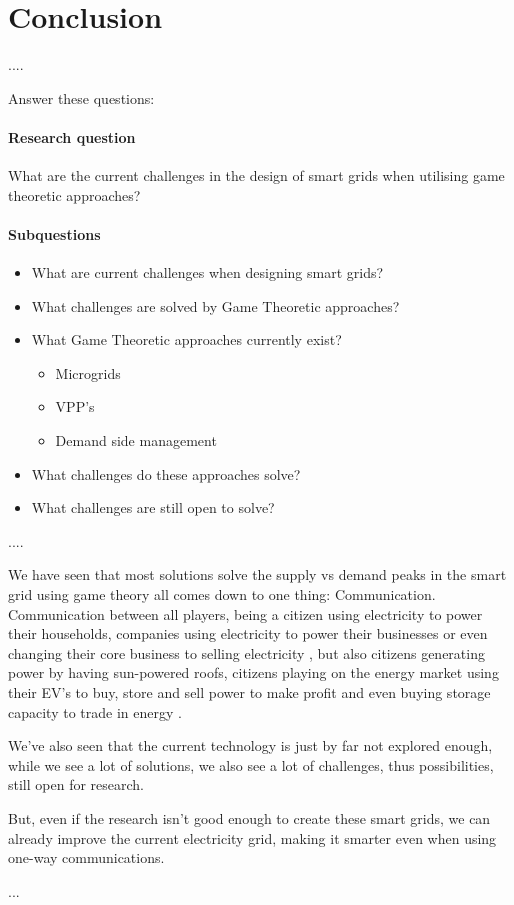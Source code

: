 \section{Conclusion}

....

Answer these questions: 
\paragraph{Research question}What are the current challenges in the design of smart grids when utilising game theoretic approaches?

\paragraph{Subquestions}
\begin{itemize}
	\item What are current challenges when designing smart grids?
	\item What challenges are solved by Game Theoretic approaches?
	\item What Game Theoretic approaches currently exist?
	\begin{itemize}
		\item Microgrids
		\item VPP’s
		\item Demand side management
	\end{itemize}
	\item What challenges do these approaches solve?
	\item What challenges are still open to solve?
\end{itemize}

....


We have seen that most solutions solve the supply vs demand peaks in the smart grid using game theory all comes down to one thing: Communication. Communication between all players, being a citizen using electricity to power their households, companies using electricity to power their businesses or even changing their core business to selling electricity \cite{Binczewski2002,Kumagai2012}, but also citizens generating power by having sun-powered roofs, citizens playing on the energy market using their EV's to buy, store and sell power to make profit and even buying storage capacity to trade in energy .

We've also seen that the current technology is just by far not explored enough, while we see a lot of solutions, we also see a lot of challenges, thus possibilities, still open for research. 

But, even if the research  isn't good enough to create these smart grids, we can already improve the current electricity grid, making it smarter even when using one-way communications. \cite{AgarwalCui2012}

...

